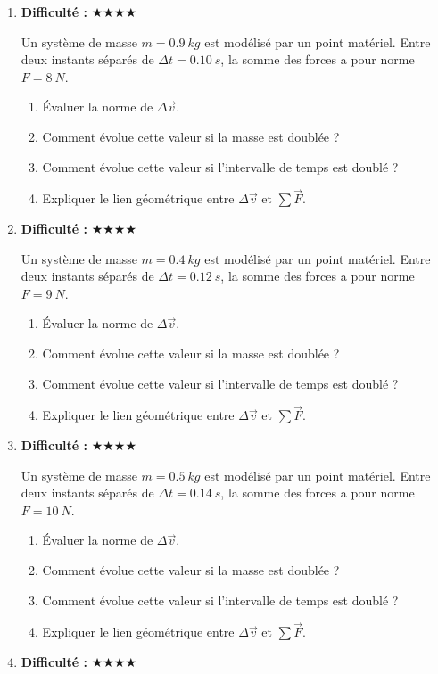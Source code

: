 \documentclass[11pt,a4paper]{article}
\newcommand{\etoiles}[1]{\textbf{Difficulté : }#1}
\begin{document}
\begin{enumerate}[label=\textbf{Exercice \arabic*.},leftmargin=*]
Un système de masse $m=0.8\ \si{kg}$ est modélisé par un point matériel.
Entre deux instants séparés de $\Delta t=0.18\ \si{s}$, la somme des forces a pour norme $F=7\ \si{N}$.
\begin{enumerate}[label=\alph*)]
\item Évaluer la norme de $\Delta \vec v$.
\item Comment évolue cette valeur si la masse est doublée ?
\item Comment évolue cette valeur si l'intervalle de temps est doublé ?
\item Expliquer le lien géométrique entre $\Delta\vec v$ et $\sum \vec F$.
\end{enumerate}
\item \etoiles{★★★★}

Un système de masse $m=0.9\ \si{kg}$ est modélisé par un point matériel.
Entre deux instants séparés de $\Delta t=0.10\ \si{s}$, la somme des forces a pour norme $F=8\ \si{N}$.
\begin{enumerate}[label=\alph*)]
\item Évaluer la norme de $\Delta \vec v$.
\item Comment évolue cette valeur si la masse est doublée ?
\item Comment évolue cette valeur si l'intervalle de temps est doublé ?
\item Expliquer le lien géométrique entre $\Delta\vec v$ et $\sum \vec F$.
\end{enumerate}
\item \etoiles{★★★★}

Un système de masse $m=0.4\ \si{kg}$ est modélisé par un point matériel.
Entre deux instants séparés de $\Delta t=0.12\ \si{s}$, la somme des forces a pour norme $F=9\ \si{N}$.
\begin{enumerate}[label=\alph*)]
\item Évaluer la norme de $\Delta \vec v$.
\item Comment évolue cette valeur si la masse est doublée ?
\item Comment évolue cette valeur si l'intervalle de temps est doublé ?
\item Expliquer le lien géométrique entre $\Delta\vec v$ et $\sum \vec F$.
\end{enumerate}
\item \etoiles{★★★★}

Un système de masse $m=0.5\ \si{kg}$ est modélisé par un point matériel.
Entre deux instants séparés de $\Delta t=0.14\ \si{s}$, la somme des forces a pour norme $F=10\ \si{N}$.
\begin{enumerate}[label=\alph*)]
\item Évaluer la norme de $\Delta \vec v$.
\item Comment évolue cette valeur si la masse est doublée ?
\item Comment évolue cette valeur si l'intervalle de temps est doublé ?
\item Expliquer le lien géométrique entre $\Delta\vec v$ et $\sum \vec F$.
\end{enumerate}
\item \etoiles{★★★★}


\end{enumerate}
\end{document}
